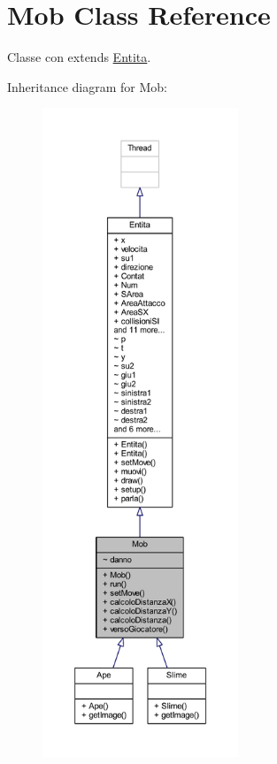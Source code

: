 \hypertarget{class_entita_1_1_mob}{}\section{Mob Class Reference}
\label{class_entita_1_1_mob}


Classe con extends \hyperlink{class_entita_1_1_entita}{Entita}.  




Inheritance diagram for Mob\+:
\nopagebreak
\begin{figure}[H]
\begin{center}
\leavevmode
\includegraphics[height=550pt]{class_entita_1_1_mob__inherit__graph}
\end{center}
\end{figure}


